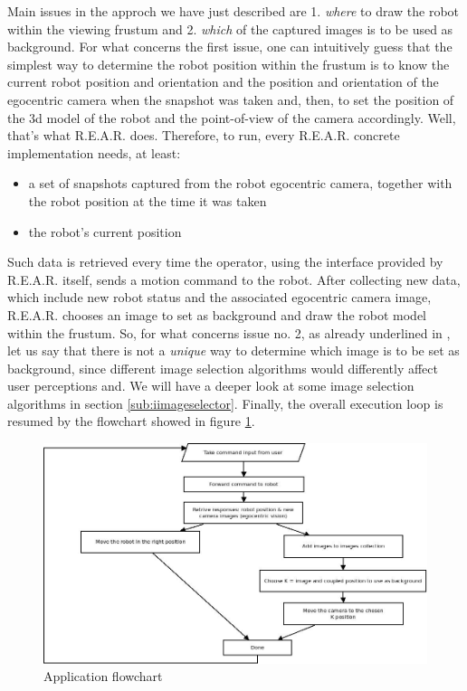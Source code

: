 %
Main issues in the approch we have just described are 1. 
\textit{where} to draw the robot within the viewing frustum 
and 2. \textit{which} of the captured images is to be used 
as background.
%
For what concerns the first issue, one can intuitively guess 
that the simplest way to determine the robot position 
within the frustum is to know the current robot position 
and orientation and the position and orientation of the egocentric 
camera when the snapshot was taken and, then, to set the 
position of the 3d model of the robot and the point-of-view 
of the camera accordingly.
Well, that's what \textsf{R.E.A.R.} does.
%
Therefore, to run, every \textsf{R.E.A.R.} concrete implementation 
needs, at least:
%
\begin{itemize}
  \item a set of snapshots captured from the robot egocentric camera, 
    together with the robot position at the time it was taken
  \item the robot's current position
\end{itemize}
%
Such data is retrieved every time the operator, using the 
interface provided by \textsf{R.E.A.R.} itself, sends a 
motion command to the robot.
%
After collecting new data, which include new robot status and
the associated egocentric camera image, \textsf{R.E.A.R.} chooses 
an image to set as background and draw the robot model within 
the frustum. So, for what concerns issue no. 2, as already 
underlined in \cite{sugimoto}, let us say that there is not 
a \textit{unique} way to determine which image is to be set 
as background, since different image selection algorithms 
would differently affect user perceptions and. We will have a 
deeper look at some image selection algorithms in section
\ref{sub:iimageselector}.
%
Finally, the overall execution loop is resumed by the flowchart 
showed in figure \ref{fig:overall_diagram}.
%
\begin{figure}[!h]
  \begin{center}
    \includegraphics[width=400pt]{img/overall_diagram.jpeg}  %
    \caption{Application flowchart}
    \label{fig:overall_diagram}
  \end{center}
\end{figure}

